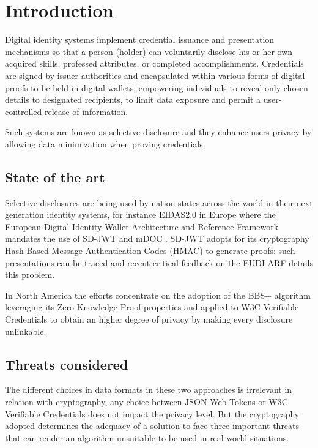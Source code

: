 \section{Introduction}
Digital identity systems implement credential issuance and
presentation mechanisms so that a person (holder) can voluntarily
disclose his or her own acquired skills, professed attributes, or
completed accomplishments. Credentials are signed by issuer
authorities and encapsulated within various forms of digital proofs to
be held in digital wallets, empowering individuals to reveal only
chosen details to designated recipients, to limit data exposure and
permit a user-controlled release of information.

Such systems are known as selective disclosure and they enhance users
privacy by allowing data minimization when proving credentials.

\subsection{State of the art}

Selective disclosures are being used by nation states across the world
in their next generation identity systems, for instance EIDAS2.0 in
Europe where the European Digital Identity Wallet Architecture and
Reference Framework\cite{eudi-arf} mandates the use of
SD-JWT\cite{sd-jwt} and mDOC \cite{mdoc}. SD-JWT adopts for its
cryptography Hash-Based Message Authentication Codes (HMAC) to
generate proofs: such presentations can be traced and recent critical
feedback on the EUDI ARF\cite{troncoso} details this problem.

In North America the efforts concentrate on the adoption of the
BBS+ algorithm\cite{bbs+} leveraging its Zero Knowledge Proof
properties and applied to W3C Verifiable Credentials\cite{w3c-vc} to
obtain an higher degree of privacy by making every disclosure
unlinkable.

\subsection{Threats considered}

The different choices in data formats in these two approaches is
irrelevant in relation with cryptography, any choice between JSON Web
Tokens or W3C Verifiable Credentials does not impact the privacy
level. But the cryptography adopted determines the adequacy of a
solution to face three important threats that can render an algorithm
unsuitable to be used in real world situations.

